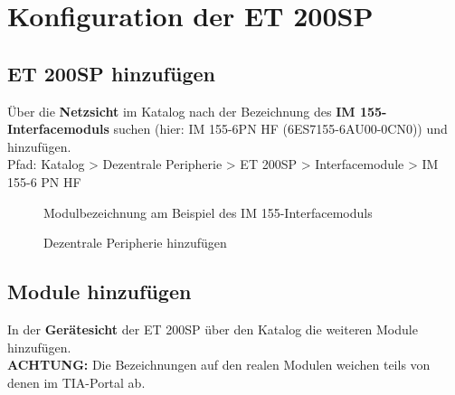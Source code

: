 \section{Konfiguration der ET 200SP} \label{sec:Konfiguration_der_ET_200_SP}

\subsection{ET 200SP hinzufügen}
Über die \textbf{Netzsicht} im Katalog nach der Bezeichnung des \textbf{IM 155-Interfacemoduls} suchen (hier: IM 155-6PN HF (6ES7155-6AU00-0CN0)) und hinzufügen.\\
Pfad: Katalog > Dezentrale Peripherie > ET 200SP > Interfacemodule > IM 155-6 PN HF

\begin{figure}[H]
    \centering
   \begin{minipage}[b]{.4\linewidth}
        \centering
        \caption[Modulbezeichnung am Beispiel des IM 155-Interfacemoduls]{Modulbezeichnung am Beispiel des IM 155-Interfacemoduls}
        \label{fig:Bild4.1}
   \end{minipage}
   \hspace{.1\linewidth}%
   \begin{minipage}[b]{.4\linewidth}
        \centering
        \caption[Dezentrale Peripherie hinzufügen]{Dezentrale Peripherie hinzufügen\\}
        \label{fig:Bild4.2}
   \end{minipage}
\end{figure}

\clearpage

\subsection{Module hinzufügen}
In der \textbf{Gerätesicht} der ET 200SP über den Katalog die weiteren Module hinzufügen.\\
\textbf{ACHTUNG:} Die Bezeichnungen auf den realen Modulen weichen teils von denen im TIA-Portal ab.

